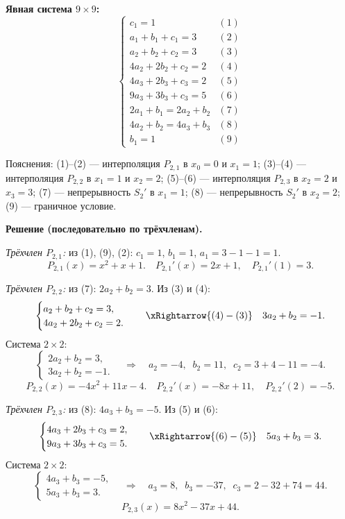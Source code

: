 \textbf{Явная система $9 \times 9$:}
\[
    \begin{cases}
        c_1 = 1 & (1) \\
        a_1 + b_1 + c_1 = 3 & (2) \\
        a_2 + b_2 + c_2 = 3 & (3) \\
        4a_2 + 2b_2 + c_2 = 2 & (4) \\
        4a_3 + 2b_3 + c_3 = 2 & (5) \\
        9a_3 + 3b_3 + c_3 = 5 & (6) \\
        2a_1 + b_1 = 2a_2 + b_2 & (7) \\
        4a_2 + b_2 = 4a_3 + b_3 & (8) \\
        b_1 = 1 & (9)
    \end{cases}
\]

Пояснения: (1)--(2) --- интерполяция $P_{2,1}$ в $x_0 = 0$ и $x_1 = 1$; (3)--(4) --- интерполяция $P_{2,2}$ в $x_1 = 1$ и $x_2 = 2$; (5)--(6) --- интерполяция $P_{2,3}$ в $x_2 = 2$ и $x_3 = 3$; (7) --- непрерывность $S_2'$ в $x_1 = 1$; (8) --- непрерывность $S_2'$ в $x_2 = 2$; (9) --- граничное условие.

\textbf{Решение (последовательно по трёхчленам).}

\textit{Трёхчлен $P_{2,1}$:} из (1), (9), (2): $c_1 = 1$, $b_1 = 1$, $a_1 = 3 - 1 - 1 = 1$.
\[
    \boxed{P_{2,1}(x) = x^2 + x + 1.} \quad P_{2,1}'(x) = 2x + 1, \quad P_{2,1}'(1) = 3.
\]

\textit{Трёхчлен $P_{2,2}$:} из (7): $2a_2 + b_2 = 3$. Из (3) и (4):
\[
    \begin{cases}
        a_2 + b_2 + c_2 = 3, \\
        4a_2 + 2b_2 + c_2 = 2.
    \end{cases}
    \quad \xRightarrow{(4)-(3)} \quad 3a_2 + b_2 = -1.
\]
Система $2 \times 2$:
\[
    \begin{cases}
        2a_2 + b_2 = 3, \\
        3a_2 + b_2 = -1.
    \end{cases}
    \quad \Longrightarrow \quad a_2 = -4, \;\; b_2 = 11, \;\; c_2 = 3 + 4 - 11 = -4.
\]
\[
    \boxed{P_{2,2}(x) = -4x^2 + 11x - 4.} \quad P_{2,2}'(x) = -8x + 11, \quad P_{2,2}'(2) = -5.
\]

\textit{Трёхчлен $P_{2,3}$:} из (8): $4a_3 + b_3 = -5$. Из (5) и (6):
\[
    \begin{cases}
        4a_3 + 2b_3 + c_3 = 2, \\
        9a_3 + 3b_3 + c_3 = 5.
    \end{cases}
    \quad \xRightarrow{(6)-(5)} \quad 5a_3 + b_3 = 3.
\]
Система $2 \times 2$:
\[
    \begin{cases}
        4a_3 + b_3 = -5, \\
        5a_3 + b_3 = 3.
    \end{cases}
    \quad \Longrightarrow \quad a_3 = 8, \;\; b_3 = -37, \;\; c_3 = 2 - 32 + 74 = 44.
\]
\[
    \boxed{P_{2,3}(x) = 8x^2 - 37x + 44.}
\]

